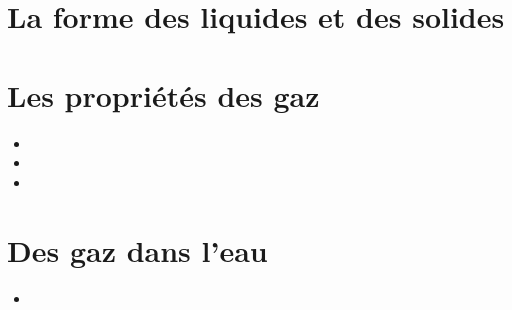\documentclass[12pt,a4paper]{article}
\date{}
\title{}
\begin{document}
	
	

\section{La forme des liquides et des solides}





\begin{myexos}
\end{myexos}

\section{Les propriétés des gaz}






\begin{myexos}
	\begin{multicols}{2}
	
		\begin{itemize}
			\item {}
			\item {}
			\item {}
		\end{itemize}
	
	\end{multicols}
\end{myexos}


\section{Des gaz dans l'eau}





\begin{myexos}
	\begin{multicols}{2}
		
		\begin{itemize}
			\item {}
		\end{itemize}
		
	\end{multicols}
\end{myexos}
\end{document}
